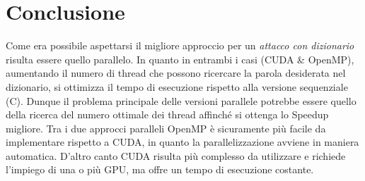 \documentclass[10pt,twocolumn,letterpaper]{article}
\begin{document}
\section{Conclusione}
Come era possibile aspettarsi il migliore approccio per un \textit{attacco con dizionario} risulta essere quello parallelo.\newline
In quanto in entrambi i casi (CUDA \& OpenMP), aumentando il numero di thread che possono ricercare la parola desiderata nel dizionario, si ottimizza il tempo di esecuzione rispetto alla versione sequenziale (C).\newline
Dunque il problema principale delle versioni parallele potrebbe essere quello della ricerca del numero ottimale dei thread affinché si ottenga lo Speedup migliore.
Tra i due approcci paralleli OpenMP è sicuramente più facile da implementare rispetto a CUDA, in quanto la parallelizzazione avviene in maniera automatica.\newline
D'altro canto CUDA risulta più complesso da utilizzare e richiede l'impiego di una o più GPU, ma offre un tempo di esecuzione costante.


{


}
\end{document}
